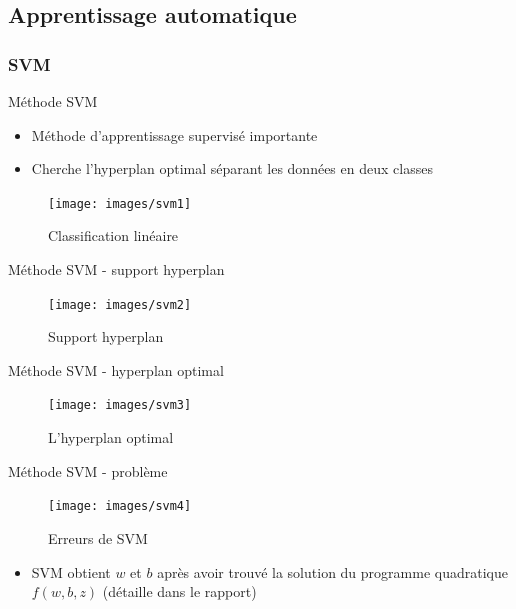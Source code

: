 \documentclass[11pt]{beamer}
\begin{document}
\begin{otherlanguage}{french}
\subsection{Apprentissage automatique}
\subsubsection*{SVM}
\begin{frame}{Méthode SVM}
\begin{itemize}
\item Méthode d'apprentissage supervisé importante
\item Cherche l'hyperplan optimal séparant les données en deux classes
\end{itemize}

\begin{figure}[ht!]
\centering
\texttt{[image: images/svm1]}
\caption{Classification linéaire}
\label{fig:svm1}
\end{figure}
\end{frame}

\begin{frame}{Méthode SVM - support hyperplan}
\begin{figure}[ht!]
\centering
\texttt{[image: images/svm2]}
\caption{Support hyperplan}
\label{fig:svm2}
\end{figure}
\end{frame}

\begin{frame}{Méthode SVM - hyperplan optimal}
\begin{figure}[ht!]
\centering
\texttt{[image: images/svm3]}
\caption{L'hyperplan optimal}
\label{fig:svm3}
\end{figure}
\end{frame}

\begin{frame}{Méthode SVM - problème}
\begin{figure}[ht!]
\centering
\texttt{[image: images/svm4]}
\caption{Erreurs de SVM}
\label{fig:svm4}
\end{figure}
\begin{itemize}
\item SVM obtient $w$ et $b$ après avoir trouvé la solution du programme quadratique $f(w, b, z)$ (détaille dans le rapport)
\end{itemize}\end{frame}



\end{otherlanguage}
\end{document}

